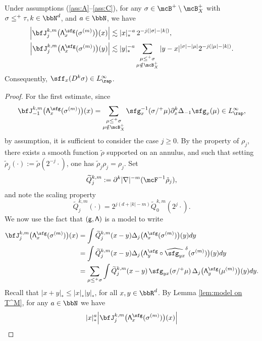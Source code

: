 \begin{lem} \label{lem:I_j^k}
Under assumptions \textup{(\ref{ass:A}--\ref{ass:C})}, for any $\sigma\in\mcB^+\setminus\mcB_X^+$ with $\sigma\le^+\tau, k\in\bbN^d$, and $a\in\bbN$, we have
\begin{align*}
\Big|\bfJ_j^{k,m}\bigl({\sf\Lambda}^{\sfg}_x(\sigma^{(m)})\bigr)(x)\Big| &\lesssim|x|_*^{-a}\,2^{-j(|\sigma|-|k|)}, \\
\Big|\bfJ_j^{k,m}\bigl({\sf\Lambda}^{\sfg}_x(\sigma^{(m)})\bigr)(y)\Big| &\lesssim|y|_*^{-a}\sum_{\substack{\mu\le^+\sigma\\\mu\notin\mcB_X^+}}|y-x|^{|\sigma|-|\mu|}2^{-j(|\mu|-|k|)}.
\end{align*}
Consequently, $\sff_x(D^k\sigma)\in L_\rap^\infty$.
\end{lem}

\begin{proof}
For the first estimate, since
\[
\bfJ_{-1}^{k,m}\bigl({\sf\Lambda}^{\sfg}_x(\sigma^{(m)})\bigr)(x) = \sum_{\substack{\mu\leq^+\sigma\\\mu\notin\mcB_X^+}}\sfg_x^{-1}(\sigma/^+\mu)\partial_x^k\Delta_{-1}\sfg_x(\mu) \in L_\rap^\infty,
\]
by assumption, it is sufficient to consider the case $j\ge0$. By the property of $\rho_j$, there exists a smooth function $\tilde\rho$ supported on an annulus, and such that setting $\tilde\rho_j(\cdot) := \tilde\rho(2^{-j}\cdot)$, one has $\widetilde{\rho}_j\rho_j=\rho_j$. Set
\[
\widetilde{Q}_j^{k,m} := \partial^k|\nabla|^{-m}(\mcF^{-1}\tilde{\rho}_j),
\]
and note the scaling property
\[
\widetilde{Q}_j^{k,m}(\cdot) = 2^{j(d+|k|-m)}\widetilde{Q}_0^{k,m}(2^j\cdot).
\]
We now use the fact that $\sf (g,\Lambda)$ is a model to write
\begin{align*}
\bfJ_j^{k,m}\bigl({\sf \Lambda}^{\sfg}_x(\sigma^{(m)})\bigr)(x)
&=\int \widetilde{Q}_j^{k,m}(x-y)\Delta_j\bigl({\sf\Lambda}^{\sfg}_x(\sigma^{(m)})\bigr)(y)dy \\
&=\int \widetilde{Q}_j^{k,m}(x-y)\Delta_j\bigl({\sf\Lambda}^{\sfg}_y\circ\widehat{\sfg_{yx}}^\delta(\sigma^{(m)})\bigr)(y)dy \\
&=\sum_{\mu\le^+\sigma} \int \widetilde{Q}_j^{k,m}(x-y)\,\sfg_{yx}(\sigma/^+\mu)\,\Delta_j\bigl({\sf\Lambda}^{\sfg}_y(\mu^{(m)})\bigr)(y)dy.
\end{align*}
Recall that $|x+y|_*\leq |x|_* |y|_*$, for all $x,y\in\bbR^d$. By Lemma \ref{lem:model on T^M}, for any $a\in\bbN$ we have
\begin{align*}
|x|_*^a\Big|\bfJ_j^{k,m}&\bigl({\sf\Lambda}^{\sfg}_x(\sigma^{(m)})\bigr)(x)\Big| \\

\end{align*}
\end{proof}

